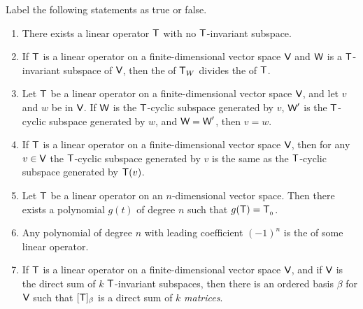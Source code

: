 \exercisesection

\begin{exercise} \label{exercise 5.4.1}
Label the following statements as true or false.
\begin{enumerate}
\item There exists a linear operator \(\textsf{T}\) with no \(\textsf{T}\)-invariant subspace.
\item If \(\textsf{T}\) is a linear operator on a finite-dimensional vector space \(\textsf{V}\) and \(\textsf{W}\) is a \(\textsf{T}\)-invariant subspace of \(\textsf{V}\), then the \CPOLY{} of \(\textsf{T}_W\) divides the \CPOLY{} of \(\textsf{T}\).
\item Let \(\textsf{T}\) be a linear operator on a finite-dimensional vector space \(\textsf{V}\), and let \(v\) and \(w\) be in \(\textsf{V}\).
If \(\textsf{W}\) is the \(\textsf{T}\)-cyclic subspace generated by \(v\), \(\textsf{W}'\) is the \(\textsf{T}\)-cyclic subspace generated by \(w\), and \(\textsf{W} = \textsf{W}'\), then \(v = w\).
\item If \(\textsf{T}\) is a linear operator on a finite-dimensional vector space \(\textsf{V}\), then for any \(v \in \textsf{V}\) the \(\textsf{T}\)-cyclic subspace generated by \(v\) is the same as the \(\textsf{T}\)-cyclic subspace generated by \(\textsf{T}(v)\).
\item Let \(\textsf{T}\) be a linear operator on an \(n\)-dimensional vector space.
Then there exists a polynomial \(g(t)\) of degree \(n\) such that \(g(\textsf{T}) = \textsf{T}_{_0}\).
\item Any polynomial of degree \(n\) with leading coefficient \((-1)^n\) is the \CPOLY{} of some linear operator.
\item If \(\textsf{T}\) is a linear operator on a finite-dimensional vector space \(\textsf{V}\), and if \(\textsf{V}\) is the direct sum of \(k\) \(\textsf{T}\)-invariant subspaces, then there is an ordered basis \(\beta\) for \(\textsf{V}\) such that \([\textsf{T}]_{\beta}\) is a direct sum of \(k\) \emph{matrices}.
\end{enumerate}
\end{exercise}

